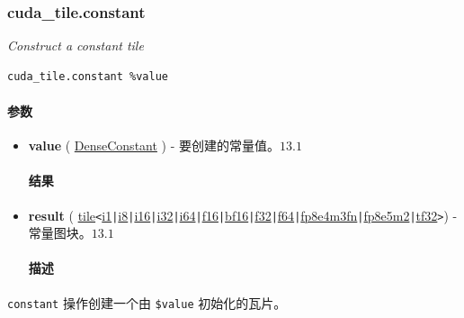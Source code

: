 \documentclass{article}
\begin{document}
\subsubsection{cuda\_tile.constant}

\textit{Construct a constant tile}


\begin{lstlisting}
cuda_tile.constant %value
\end{lstlisting}

\paragraph{参数}

\begin{itemize}
\item \textbf{value} ( \href{https://docs.nvidia.com/cuda/tile-ir/latest/sections/operations.html#type-denseconstant}{DenseConstant} ) - 要创建的常量值。$\boxed{13.1}$


\paragraph{结果}

\item \textbf{result} ( \href{https://docs.nvidia.com/cuda/tile-ir/latest/sections/types.html#type-tile}{tile}\texttt{<}\href{https://docs.nvidia.com/cuda/tile-ir/latest/sections/types.html#subsection-element-types}{i1}\texttt{|}\href{https://docs.nvidia.com/cuda/tile-ir/latest/sections/types.html#subsection-element-types}{i8}\texttt{|}\href{https://docs.nvidia.com/cuda/tile-ir/latest/sections/types.html#subsection-element-types}{i16}\texttt{|}\href{https://docs.nvidia.com/cuda/tile-ir/latest/sections/types.html#subsection-element-types}{i32}\texttt{|}\href{https://docs.nvidia.com/cuda/tile-ir/latest/sections/types.html#subsection-element-types}{i64}\texttt{|}\href{https://docs.nvidia.com/cuda/tile-ir/latest/sections/types.html#subsection-element-types}{f16}\texttt{|}\href{https://docs.nvidia.com/cuda/tile-ir/latest/sections/types.html#subsection-element-types}{bf16}\texttt{|}\href{https://docs.nvidia.com/cuda/tile-ir/latest/sections/types.html#subsection-element-types}{f32}\texttt{|}\href{https://docs.nvidia.com/cuda/tile-ir/latest/sections/types.html#subsection-element-types}{f64}\texttt{|}\href{https://docs.nvidia.com/cuda/tile-ir/latest/sections/types.html#subsection-element-types}{fp8e4m3fn}\texttt{|}\href{https://docs.nvidia.com/cuda/tile-ir/latest/sections/types.html#subsection-element-types}{fp8e5m2}\texttt{|}\href{https://docs.nvidia.com/cuda/tile-ir/latest/sections/types.html#subsection-element-types}{tf32}\texttt{>}) - 常量图块。$\boxed{13.1}$


\paragraph{描述}

\end{itemize}
\texttt{constant} 操作创建一个由 \texttt{\$value} 初始化的瓦片。
\end{document}
